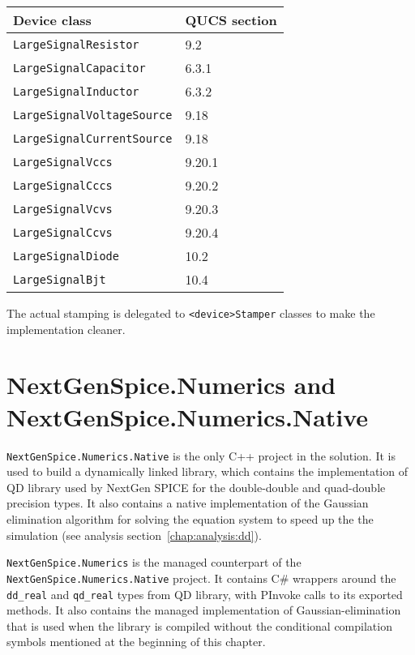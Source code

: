 \begin{center}
	\begin{tabular}{|l|l|}
		\hline
		Device class & QUCS section \\ \hline \hline
		\texttt{LargeSignalResistor} & 9.2 \\ \hline
		\texttt{LargeSignalCapacitor} & 6.3.1 \\ \hline
		\texttt{LargeSignalInductor} & 6.3.2 \\ \hline
		\texttt{LargeSignalVoltageSource} & 9.18 \\ \hline
		\texttt{LargeSignalCurrentSource} & 9.18 \\ \hline
		\texttt{LargeSignalVccs} & 9.20.1 \\ \hline
		\texttt{LargeSignalCccs} & 9.20.2 \\ \hline
		\texttt{LargeSignalVcvs} & 9.20.3 \\ \hline
		\texttt{LargeSignalCcvs} & 9.20.4 \\ \hline
		\texttt{LargeSignalDiode} & 10.2 \\ \hline
		\texttt{LargeSignalBjt} & 10.4 \\ \hline
	\end{tabular}
\end{center}

The actual stamping is delegated to \texttt{<device>Stamper} classes to make the implementation cleaner. 

\section[NextGenSpice.Numerics and NextGenSpice.Numerics.Native]{NextGenSpice.Numerics and \\ NextGenSpice.Numerics.Native}

\texttt{NextGenSpice.Numerics.Native} is the only C++ project in the solution. It is used to build a dynamically linked library, which contains the implementation of QD library used by NextGen SPICE for the double-double and quad-double precision types. It also contains a native implementation of the Gaussian elimination algorithm for solving the equation system to speed up the the simulation (see analysis section~\ref{chap:analysis:dd}).

\texttt{NextGenSpice.Numerics} is the managed counterpart of the \texttt{NextGenSpice\+.Numerics.Native} project. It contains C\# wrappers around the \texttt{dd\_real} and \texttt{qd\_real} types from QD library, with PInvoke calls to its exported methods. It also contains the managed implementation of Gaussian-elimination that is used when the library is compiled without the conditional compilation symbols mentioned at the beginning of this chapter.

